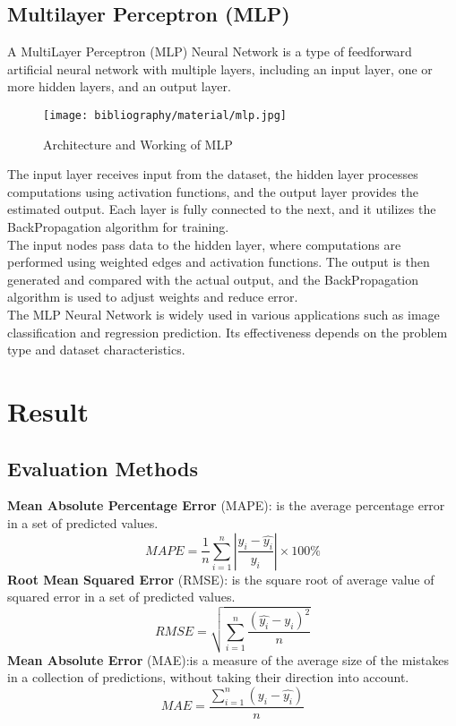 \documentclass{ieeeojies}
\begin{document}
	\subsection{Multilayer Perceptron (MLP)}
	
	A MultiLayer Perceptron (MLP) Neural Network is a type of feedforward artificial neural network with multiple layers, including an input layer, one or more hidden layers, and an output layer.\\
	\begin{figure}[H] %
		\centering
		\texttt{[image: bibliography/material/mlp.jpg]}
		\caption{Architecture and Working of MLP}
	\end{figure}
	The input layer receives input from the dataset, the hidden layer processes computations using activation functions, and the output layer provides the estimated output. Each layer is fully connected to the next, and it utilizes the BackPropagation algorithm for training.\\
	The input nodes pass data to the hidden layer, where computations are performed using weighted edges and activation functions. The output is then generated and compared with the actual output, and the BackPropagation algorithm is used to adjust weights and reduce error. \\
	The MLP Neural Network is widely used in various applications such as image classification and regression prediction. Its effectiveness depends on the problem type and dataset characteristics. \cite{b17} \\
	
	
	\section{Result}
	\subsection{Evaluation Methods}
	\textbf{Mean Absolute Percentage Error} (MAPE): is the average percentage error in a set of predicted values. \cite{b18}
	\[MAPE = \frac{1}{n} \sum_{i=1}^n \left| \frac{y_i - \hat{y_i}}{y_i} \right| \times 100\%\]
	\textbf{Root Mean Squared Error} (RMSE): is the square root of average value of squared error in a set of predicted values. \cite{b19}
	\[RMSE=\sqrt{\sum_{i=1}^{n} \frac{(\hat{y_i}-y_i )^2}{n} }\]
	\textbf{Mean Absolute Error} (MAE):is a measure of the average size of the mistakes in a collection of predictions, without taking their direction into account. \cite{b20} \[MAE=\frac{\sum_{i=1}^{n} (y_i - \hat{y_i})}{n}\]
	
\end{document}
